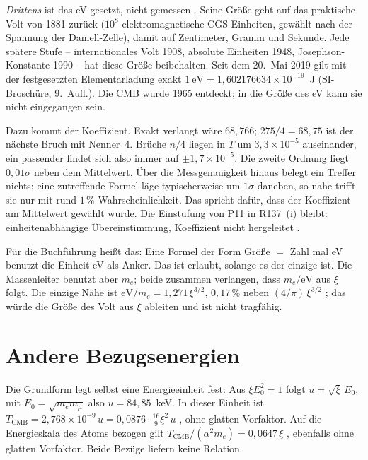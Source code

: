 \emph{Drittens} ist das eV gesetzt, nicht gemessen \QM. Seine Größe geht auf das praktische Volt
von 1881 zurück ($10^8$ elektromagnetische CGS-Einheiten, gewählt nach der Spannung der
Daniell-Zelle), damit auf Zentimeter, Gramm und Sekunde. Jede spätere Stufe -- internationales
Volt 1908, absolute Einheiten 1948, Josephson-Konstante 1990 -- hat diese Größe beibehalten. Seit
dem 20.~Mai 2019 gilt mit der festgesetzten Elementarladung exakt
$1\ \mathrm{eV}=1{,}602176634\times10^{-19}$~J (SI-Broschüre, 9.~Aufl.). Die CMB wurde 1965
entdeckt; in die Größe des eV kann sie nicht eingegangen sein.

Dazu kommt der Koeffizient. Exakt verlangt wäre $68{,}766$; $275/4=68{,}75$ ist der nächste Bruch
mit Nenner~4. Brüche $n/4$ liegen in $T$ um $3{,}3\times10^{-5}$ auseinander, ein passender findet
sich also immer auf $\pm1{,}7\times10^{-5}$. Die zweite Ordnung liegt $0{,}01\sigma$ neben dem
Mittelwert. Über die Messgenauigkeit hinaus belegt ein Treffer nichts; eine zutreffende Formel läge
typischerweise um $1\sigma$ daneben, so nahe trifft sie nur mit rund $1\,\%$ Wahrscheinlichkeit.
Das spricht dafür, dass der Koeffizient am Mittelwert gewählt wurde.
Die Einstufung von P11 in R137~(i) bleibt: einheitenabhängige Übereinstimmung, Koeffizient nicht
hergeleitet \SM.

Für die Buchführung heißt das: Eine Formel der Form \glqq Größe $=$ Zahl mal eV\grqq{} benutzt die
Einheit eV als Anker. Das ist erlaubt, solange es der einzige ist. Die Massenleiter benutzt aber
$m_e$; beide zusammen verlangen, dass $m_e/\mathrm{eV}$ aus $\xi$ folgt. Die einzige Nähe ist
$\mathrm{eV}/m_e=1{,}271\,\xi^{3/2}$, $0{,}17\,\%$ neben $(4/\pi)\,\xi^{3/2}$ \KM; das würde die
Größe des Volt aus $\xi$ ableiten und ist nicht tragfähig.

\section{Andere Bezugsenergien}

Die Grundform legt selbst eine Energieeinheit fest: Aus $\xi E_0^2=1$ folgt
$u=\sqrt{\xi}\,E_0$, mit $E_0=\sqrt{m_em_\mu}$ also $u=84{,}85$~keV. In dieser Einheit ist
$T_{\mathrm{CMB}}=2{,}768\times10^{-9}\,u=0{,}0876\cdot\frac{16}{9}\xi^2\,u$ \KM, ohne glatten
Vorfaktor. Auf die Energieskala des Atoms bezogen gilt
$T_{\mathrm{CMB}}/(\alpha^2m_e)=0{,}0647\,\xi$ \KM, ebenfalls ohne glatten Vorfaktor. Beide
Bezüge liefern keine Relation.

